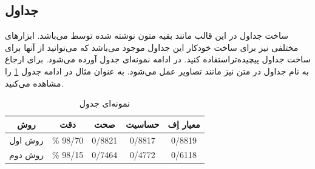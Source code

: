 \subsection{جداول}
ساخت جداول در این قالب مانند بقیه متون نوشته شده توسط  می‌باشد. ابزارهای مختلفی نیز برای ساخت خودکار این جداول موجود می‌باشد که می‌توانید از آنها  برای ساخت جداول پیچیده‌تراستفاده کنید. در ادامه نمونه‌ای جدول آورده می‌شود. برای ارجاع به نام جداول در متن نیز مانند تصاویر عمل می‌شود. به عنوان مثال در ادامه جدول \ref{tab:tch} را مشاهده می‌کنید.

\begin{table}[h]
	\begin{center}
		\caption{نمونه‌ای جدول}
		\begin{tabular}{|c|c|c|c|c|}
			\hline
			روش & 
			دقت & صحت & حساسیت & معیار اِف \\
			\hline
			
			روش اول & 
			\% 98/70 & 0/8821 & 0/8817 & 0/8819 \\
			\hline
			
			روش دوم & 
			\% 98/15 & 0/7464 & 0/4772 & 0/6118 \\
			\hline
		\end{tabular}
		\label{tab:tch}
	\end{center}
\end{table}

